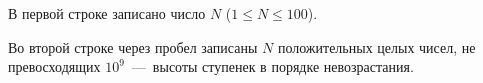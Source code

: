 В первой строке записано число $N$ ($1 \le N \le 100$).

Во второй строке через пробел записаны $N$ положительных целых чисел, не превосходящих $10^9$~---~высоты ступенек в порядке невозрастания.